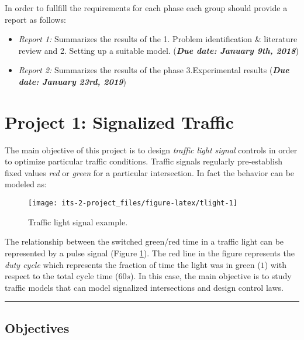 \documentclass[]{book}
\theoremstyle{definition}
\theoremstyle{definition}
\theoremstyle{definition}
\theoremstyle{remark}
\begin{document}
In order to fullfill the requirements for each phase each group should
provide a report as follows:

\begin{itemize}
\item
  \emph{Report 1:} Summarizes the results of the 1. Problem
  identification \& literature review and 2. Setting up a suitable
  model. (\textbf{\emph{Due date: January 9th, 2018}})
\item
  \emph{Report 2:} Summarizes the results of the phase 3.Experimental
  results (\textbf{\emph{Due date: January 23rd, 2019}})
\end{itemize}

\hypertarget{project-1-signalized-traffic}{%
\chapter*{Project 1: Signalized
Traffic}\label{project-1-signalized-traffic}}

The main objective of this project is to design \emph{traffic light
signal} controls in order to optimize particular traffic conditions.
Traffic signals regularly pre-establish fixed values \emph{red} or
\emph{green} for a particular intersection. In fact the behavior can be
modeled as:



\begin{figure}

{\centering \texttt{[image: its-2-project\_files/figure-latex/tlight-1]} 

}

\caption{Traffic light signal example.}\label{fig:tlight}
\end{figure}

The relationship between the switched green/red time in a traffic light
can be represented by a pulse signal (Figure \ref{fig:tlight}). The red
line in the figure represents the \emph{duty cycle} which represents the
fraction of time the light was in green (\(1\)) with respect to the
total cycle time (\(60s\)). In this case, the main objective is to study
traffic models that can model signalized intersections and design
control laws.

\begin{center}\rule{0.5\linewidth}{\linethickness}\end{center}

\hypertarget{objectives}{%
\section*{Objectives}\label{objectives}}
\end{document}
